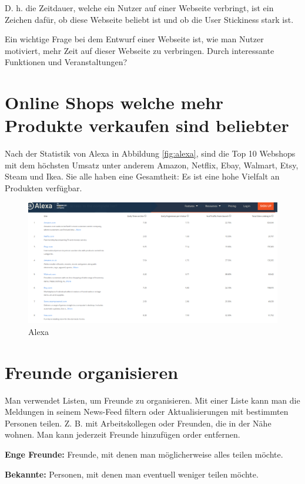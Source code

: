 D. h. die Zeitdauer, welche ein Nutzer auf einer Webseite verbringt, ist ein Zeichen dafür, ob diese Webseite beliebt ist und ob die User Stickiness stark ist.

Ein wichtige Frage bei dem Entwurf einer Webseite ist, wie man Nutzer motiviert, mehr Zeit auf dieser Webseite zu verbringen. Durch interessante Funktionen und Veranstaltungen?


\section{Online Shops welche mehr Produkte verkaufen sind beliebter}

Nach der Statistik von Alexa in Abbildung \vref{fig:alexa}, sind die Top 10 Webshops mit dem höchsten Umsatz unter anderem Amazon, Netflix, Ebay, Walmart, Etsy, Steam und Ikea. Sie alle haben eine Gesamtheit: Es ist eine hohe Vielfalt an Produkten verfügbar.

\begin{figure}
	\centering
	\includegraphics[width=1\textwidth]{bilder/alexa.png}
	\caption{Alexa}
	\label{fig:alexa}
\end{figure}


\section{Freunde organisieren}

Man verwendet Listen, um  Freunde zu organisieren. Mit einer Liste kann man die Meldungen in seinem News-Feed filtern oder Aktualisierungen mit bestimmten Personen teilen. Z. B. mit Arbeitskollegen oder Freunden, die in der Nähe wohnen. Man kann jederzeit Freunde hinzufügen order entfernen. \parencite{facebook:help}

\textbf{Enge Freunde:} Freunde, mit denen man möglicherweise alles teilen möchte.

\textbf{Bekannte:} Personen, mit denen man eventuell weniger teilen möchte.

